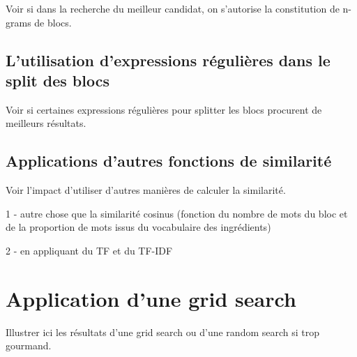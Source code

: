             Voir si dans la recherche du meilleur candidat, on s'autorise la constitution de \og n-grams \fg de blocs.

            \subsection{L'utilisation d'expressions régulières dans le split des blocs}

            Voir si certaines expressions régulières pour splitter les blocs procurent de meilleurs résultats.

            \subsection{Applications d'autres fonctions de similarité}

            Voir l'impact d'utiliser d'autres manières de calculer la similarité.

            1 - autre chose que la similarité cosinus (fonction du nombre de mots du bloc et de la proportion de mots issus du vocabulaire des ingrédients)

            2 - en appliquant du TF et du TF-IDF

        \section{Application d'une grid search}

        Illustrer ici les résultats d'une grid search ou d'une random search si trop gourmand.